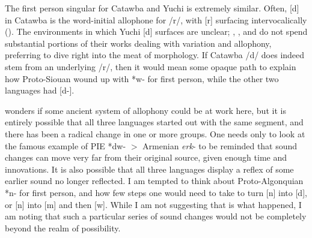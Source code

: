 \documentclass[output=paper]{LSP/langsci}
\begin{document}
{The first person singular for Catawba and Yuchi is extremely similar. Often, [d] in Catawba is the word-initial allophone for /r/, with [r] surfacing intervocalically (\citealt{Rudes2007}). The environments in which Yuchi [d] surfaces are unclear; \citet{Gatschet1885}, \citet{Wagner1934}, and \citet{Linn2000} do not spend substantial portions of their works dealing with variation and allophony, preferring to dive right into the meat of morphology. If Catawba /d/ does indeed stem from an underlying /r/, then it would mean some opaque path to explain how Proto-Siouan wound up with *w- for first person, while the other two languages had [d-]. 

\citet{Rankin1998} wonders if some ancient system of allophony could be at work here, but it is entirely possible that all three languages started out with the same segment, and there has been a radical change in one or more groups. One needs only to look at the famous example of PIE *dw- $>$ Armenian \emph{erk}- to be reminded that sound changes can move very far from their original source, given enough time and innovations. It is also possible that all three languages display a reflex of some earlier sound no longer reflected. I am tempted to think about Proto-Algonquian *n- for first person, and how few steps one would need to take to turn [n] into [d], or [n] into [m] and then [w]. While I am not suggesting that is what happened, I am noting that such a particular series of sound changes would not be completely beyond the realm of possibility.

}
\end{document}
